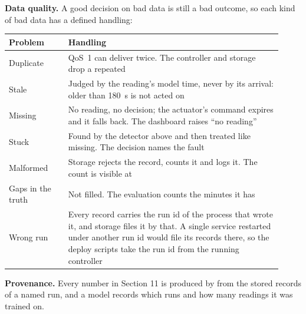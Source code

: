 \textbf{Data quality.} A good decision on bad data is still a bad outcome, so
each kind of bad data has a defined handling:

\begin{longtable}[]{@{}L{0.20\linewidth}L{0.72\linewidth}@{}}
\toprule
\textbf{Problem} & \textbf{Handling} \\
\midrule
\endhead
Duplicate & QoS~1 can deliver twice. The controller and storage drop a repeated  \\
Stale & Judged by the reading's model time, never by its arrival: older than 180~s is not acted on \\
Missing & No reading, no decision; the actuator's command expires and it falls back. The dashboard raises ``no reading'' \\
Stuck & Found by the detector above and then treated like missing. The decision names the fault \\
Malformed & Storage rejects the record, counts it and logs it. The count is visible at  \\
Gaps in the truth & Not filled. The evaluation counts the minutes it has \\
Wrong run & Every record carries the run id of the process that wrote it, and storage files it by that. A single service restarted under another run id would file its records there, so the deploy scripts take the run id from the running controller \\
\bottomrule
\end{longtable}

\textbf{Provenance.} Every number in Section 11 is produced by
 from the stored records of a named run, and a model
records which runs and how many readings it was trained on.
